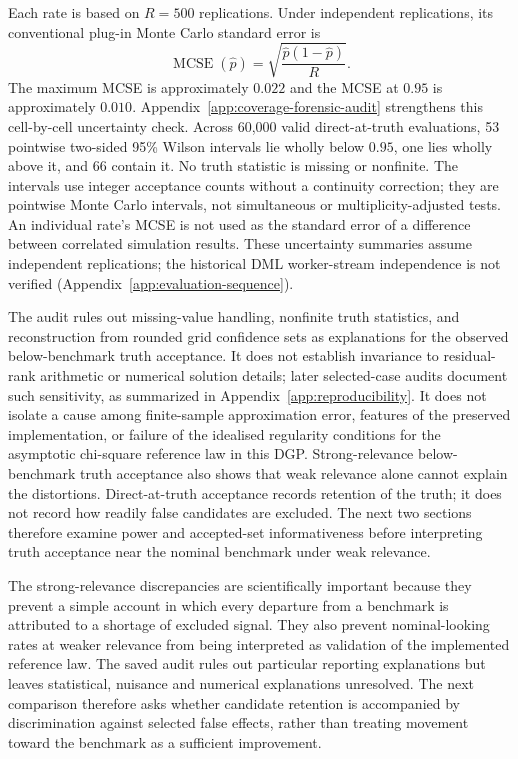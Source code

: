 Each rate is based on $R=500$ replications. Under independent replications, its conventional plug-in Monte Carlo standard error is
\[
\operatorname{MCSE}(\widehat p)
=
\sqrt{\frac{\widehat p(1-\widehat p)}{R}}.
\]
The maximum MCSE is approximately $0.022$ and the MCSE at $0.95$ is approximately $0.010$. Appendix~\ref{app:coverage-forensic-audit} strengthens this cell-by-cell uncertainty check. Across 60,000 valid direct-at-truth evaluations, 53 pointwise two-sided 95\% Wilson intervals lie wholly below $0.95$, one lies wholly above it, and 66 contain it. No truth statistic is missing or nonfinite. The intervals use integer acceptance counts without a continuity correction; they are pointwise Monte Carlo intervals, not simultaneous or multiplicity-adjusted tests. An individual rate's MCSE is not used as the standard error of a difference between correlated simulation results. These uncertainty summaries assume independent replications; the historical DML worker-stream independence is not verified (Appendix~\ref{app:evaluation-sequence}).

The audit rules out missing-value handling, nonfinite truth statistics, and reconstruction from rounded grid confidence sets as explanations for the observed below-benchmark truth acceptance. It does not establish invariance to residual-rank arithmetic or numerical solution details; later selected-case audits document such sensitivity, as summarized in Appendix~\ref{app:reproducibility}. It does not isolate a cause among finite-sample approximation error, features of the preserved implementation, or failure of the idealised regularity conditions for the asymptotic chi-square reference law in this DGP. Strong-relevance below-benchmark truth acceptance also shows that weak relevance alone cannot explain the distortions. Direct-at-truth acceptance records retention of the truth; it does not record how readily false candidates are excluded. The next two sections therefore examine power and accepted-set informativeness before interpreting truth acceptance near the nominal benchmark under weak relevance.

The strong-relevance discrepancies are scientifically important because they prevent a simple account in which every departure from a benchmark is attributed to a shortage of excluded signal. They also prevent nominal-looking rates at weaker relevance from being interpreted as validation of the implemented reference law. The saved audit rules out particular reporting explanations but leaves statistical, nuisance and numerical explanations unresolved. The next comparison therefore asks whether candidate retention is accompanied by discrimination against selected false effects, rather than treating movement toward the benchmark as a sufficient improvement.

